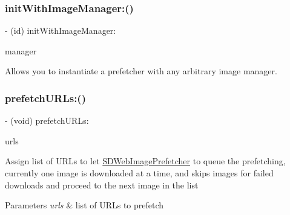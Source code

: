 \subsubsection{\texorpdfstring{init\+With\+Image\+Manager\+:()}{initWithImageManager:()}\hspace{0.1cm}{\footnotesize\ttfamily [3/3]}}
{\footnotesize\ttfamily -\/ (id) init\+With\+Image\+Manager\+: \begin{DoxyParamCaption}\item[{(\mbox{\hyperlink{interface_s_d_web_image_manager}{S\+D\+Web\+Image\+Manager}} $\ast$)}]{manager }\end{DoxyParamCaption}}

Allows you to instantiate a prefetcher with any arbitrary image manager. \mbox{\label{interface_s_d_web_image_prefetcher_aca785918119f2b0d08ee1ff8b5310365}} 
\subsubsection{\texorpdfstring{prefetch\+U\+R\+Ls\+:()}{prefetchURLs:()}\hspace{0.1cm}{\footnotesize\ttfamily [1/3]}}
{\footnotesize\ttfamily -\/ (void) prefetch\+U\+R\+Ls\+: \begin{DoxyParamCaption}\item[{(N\+S\+Array $\ast$)}]{urls }\end{DoxyParamCaption}}

Assign list of U\+R\+Ls to let \mbox{\hyperlink{interface_s_d_web_image_prefetcher}{S\+D\+Web\+Image\+Prefetcher}} to queue the prefetching, currently one image is downloaded at a time, and skips images for failed downloads and proceed to the next image in the list


\begin{DoxyParams}{Parameters}
{\em urls} & list of U\+R\+Ls to prefetch \\
\hline
\end{DoxyParams}
\mbox{\label{interface_s_d_web_image_prefetcher_aca785918119f2b0d08ee1ff8b5310365}} 

